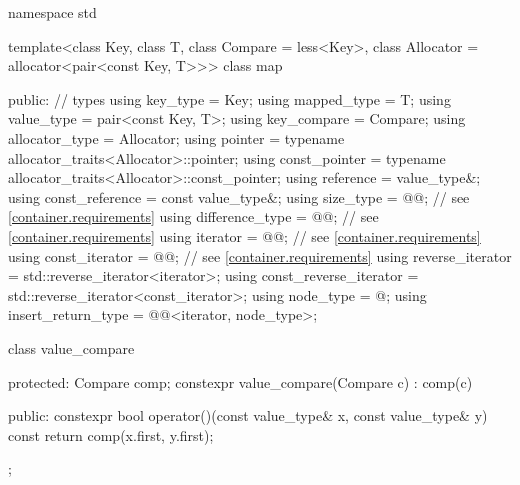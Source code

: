 %
%
\begin{codeblock}
namespace std {
  template<class Key, class T, class Compare = less<Key>,
           class Allocator = allocator<pair<const Key, T>>>
  class map {
  public:
    // types
    using key_type               = Key;
    using mapped_type            = T;
    using value_type             = pair<const Key, T>;
    using key_compare            = Compare;
    using allocator_type         = Allocator;
    using pointer                = typename allocator_traits<Allocator>::pointer;
    using const_pointer          = typename allocator_traits<Allocator>::const_pointer;
    using reference              = value_type&;
    using const_reference        = const value_type&;
    using size_type              = @@; // see \ref{container.requirements}
    using difference_type        = @@; // see \ref{container.requirements}
    using iterator               = @@; // see \ref{container.requirements}
    using const_iterator         = @@; // see \ref{container.requirements}
    using reverse_iterator       = std::reverse_iterator<iterator>;
    using const_reverse_iterator = std::reverse_iterator<const_iterator>;
    using node_type              = @\unspec@;
    using insert_return_type     = @@<iterator, node_type>;

    class value_compare {
    protected:
      Compare comp;
      constexpr value_compare(Compare c) : comp(c) {}

    public:
      constexpr bool operator()(const value_type& x, const value_type& y) const {
        return comp(x.first, y.first);
      }
    };

}}
\end{codeblock}
